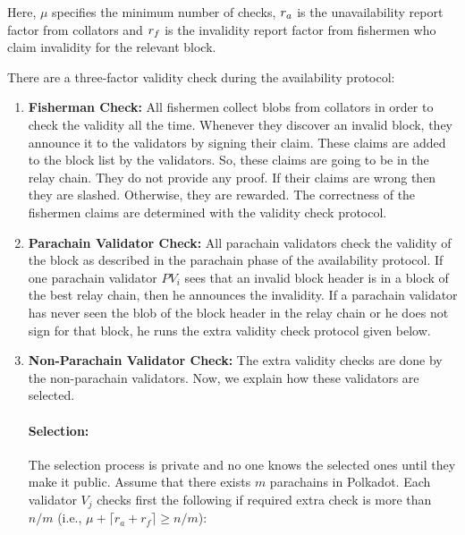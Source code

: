 Here, $\mu$ specifies the minimum number of checks, $r_{a}$ is the unavailability report factor from collators and $r_{f}$ is the invalidity report factor from fishermen who claim invalidity for the relevant block. 






There are a three-factor validity check during the availability protocol:


\begin{enumerate}

      
    \item \textbf{Fisherman Check:} All fishermen collect blobs from collators in order to check the validity all the time. Whenever they discover an invalid block, they announce it to the validators by signing their claim. These claims are added to the block list by the validators. So, these claims are going to be in the relay chain. They do not provide any proof. If their claims are wrong then they are slashed. Otherwise, they are rewarded. The correctness of the fishermen claims are determined with the validity check protocol.
    
    \item \textbf{Parachain Validator Check:} All parachain validators check the validity of the block as described in the parachain phase of the availability protocol. If one parachain validator $PV_i$ sees that an invalid block header is in a block of the best relay chain, then he announces the invalidity. If a parachain validator has never seen the blob of the block header in the relay chain or he does not sign for that block, he runs the extra validity check protocol given below.
    
    \item \textbf{Non-Parachain Validator Check:} The extra validity checks are done by the non-parachain validators. Now, we explain how these validators are selected.
    
    \paragraph{Selection:} The selection process is private and no one knows the selected ones until they make it public. Assume that there exists $m$ parachains in Polkadot. Each validator $V_j$ checks first the following if required extra check is more than $n/m$ (i.e., $\mu + \lceil r_a + r_f \rceil \geq n/m$): 
    

\end{enumerate}
